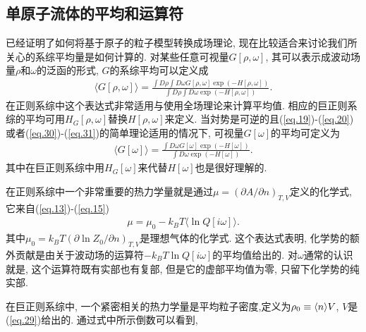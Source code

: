 \subsection{单原子流体的平均和运算符}
已经证明了如何将基于原子的粒子模型转换成场理论,
现在比较适合来讨论我们所关心的系综平均量是如何计算的.
对某些任意可视量$G[\rho, \omega]$,
其可以表示成波动场量$\rho$和$\omega$的泛函的形式, $G$的系综平均可以定义成
\label{subsec.equations}
   \begin{equation}
       \begin{aligned}
           \langle G[\rho, \omega] \rangle=\frac{\int D\rho \int D\omega G[\rho,
           \omega] \exp(-H[\rho, \omega])}{\int D\rho \int D\omega
           \exp(-H[\rho, \omega])}.
       \end{aligned}
       \label{eq.32}      
    \end{equation}
在正则系综中这个表达式非常适用与使用全场理论来计算平均值.
相应的巨正则系综的平均可用$H_G[\rho, \omega]$替换$H[\rho, \omega]$来定义.
当対势是可逆的且(\ref{eq.19})-(\ref{eq.20})或者(\ref{eq.30})-(\ref{eq.31})的简单理论适用的情况下,
可视量$G[\omega]$的平均可定义为
\label{subsec.equations}
   \begin{equation}
       \begin{aligned}
           \langle G[\omega] \rangle=\frac{\int D\omega G[\omega] \exp(-H[\omega])}{\int D\omega
           \exp(-H[\omega])}.
       \end{aligned}
       \label{eq.33}      
    \end{equation}
其中在巨正则系综中用$H_G[\omega]$来代替$H[\omega]$也是很好理解的.
\par
在正则系综中一个非常重要的热力学量就是通过$\mu=(\partial A/\partial n)_{T,
V}$定义的化学式, 它来自(\ref{eq.13})-(\ref{eq.15})
\label{subsec.equations}
   \begin{equation}
       \begin{aligned}
           \mu=\mu_0-k_BT \langle \ln Q[i\omega] \rangle.
       \end{aligned}
       \label{eq.34}      
    \end{equation}
其中$\mu_0=k_B T(\partial \ln Z_0/\partial n)_{T, V}$是理想气体的化学式.
这个表达式表明, 化学势的额外贡献是由关于波动场的运算符$-k_BT\ln
Q[i\omega]$的平均值给出的. 对$\omega$通常的认识就是,
这个运算符既有实部也有复部, 但是它的虚部平均值为零, 只留下化学势的纯实部.
\par
在巨正则系综中, 一个紧密相关的热力学量是平均粒子密度,定义为$\rho_0\equiv
\langle n \rangle\/V$, $V$是(\ref{eq.29})给出的. 通过式中所示倒数可以看到,
